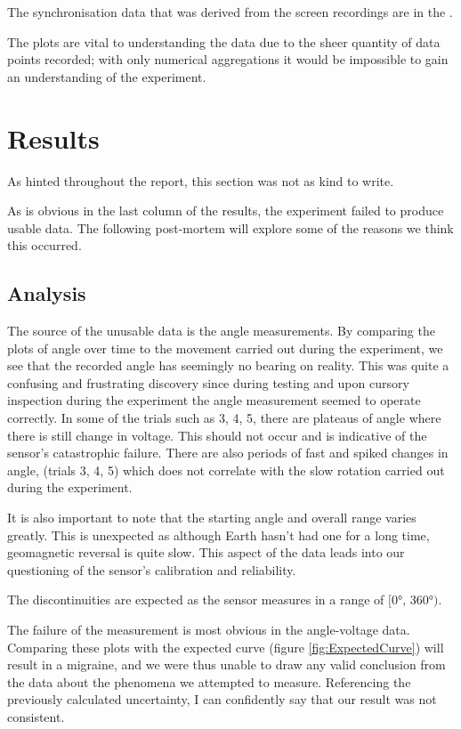 The synchronisation data that was derived from the screen recordings are in the .

The plots are vital to understanding the data due to the sheer quantity of data points recorded; with only numerical aggregations it would be impossible to gain an understanding of the experiment.



\section*{Results}

As hinted throughout the report, this section was not as kind to write. 

As is obvious in the last column of the results, the experiment failed to produce usable data. The following post-mortem will explore some of the reasons we think this occurred.

\subsection*{Analysis}

The source of the unusable data is the angle measurements. By comparing the plots of angle over time to the movement carried out during the experiment, we see that the recorded angle has seemingly no bearing on reality. This was quite a confusing and frustrating discovery since during testing and upon cursory inspection during the experiment the angle measurement seemed to operate correctly. 
In some of the trials such as 3, 4, 5, there are plateaus of angle where there is still change in voltage. This should not occur and is indicative of the sensor's catastrophic failure. There are also periods of fast and spiked changes in angle, (trials 3, 4, 5) which does not correlate with the slow rotation carried out during the experiment.

It is also important to note that the starting angle and overall range varies greatly. This is unexpected as although Earth hasn't had one for a long time, geomagnetic reversal is quite slow. This aspect of the data leads into our questioning of the sensor's calibration and reliability.

The discontinuities are expected as the sensor measures in a range of $[0°, \, 360°)$.

The failure of the measurement is most obvious in the angle-voltage data. Comparing these plots with the expected curve (figure \ref{fig:ExpectedCurve}) will result in a migraine, and we were thus unable to draw any valid conclusion from the data about the phenomena we attempted to measure. Referencing the previously calculated uncertainty, I can confidently say that our result was not consistent.

